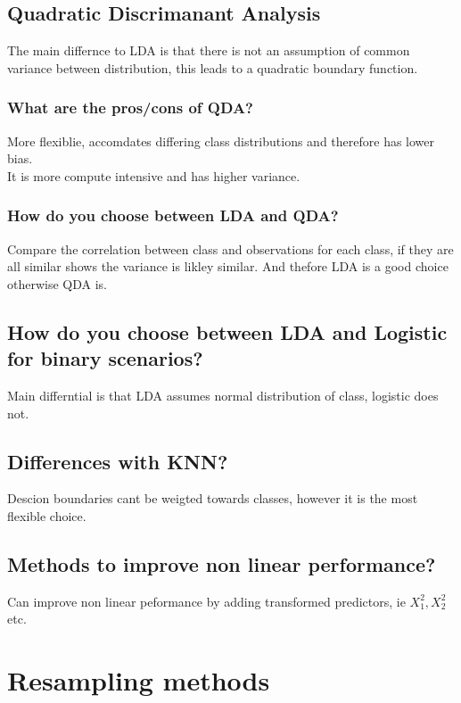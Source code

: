 \documentclass[11pt]{scrartcl} %
\begin{document}
\subsection{Quadratic Discrimanant Analysis}

The main differnce to LDA is that there is not an assumption of common variance between distribution,
this leads to a quadratic boundary function. 

\subsubsection{What are the pros/cons of QDA?}

More flexiblie, accomdates differing class distributions and therefore has lower bias.\\

It is more compute intensive and has higher variance.

\subsubsection{How do you choose between LDA and QDA?}

Compare the correlation between class and observations for each class, if they are all similar shows
the variance is likley similar. And thefore LDA is a good choice otherwise QDA is.

\subsection{How do you choose between LDA and Logistic for binary scenarios?}

Main differntial is that LDA assumes normal distribution of class, logistic does not.

\subsection{Differences with KNN?}

Descion boundaries cant be weigted towards classes, however it is the most flexible choice.

\subsection{Methods to improve non linear performance?}

Can improve non linear peformance by adding transformed predictors, ie \(X_1^2,X_2^2\) etc.

\section{Resampling methods}
\end{document}
